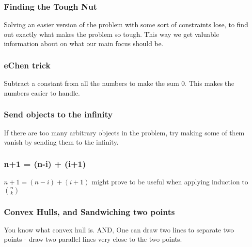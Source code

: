 	\Faka\subsubsection{Finding the Tough Nut}{Solving an easier version of the problem with some sort of constraints lose, to find out exactly what makes the problem so tough. This way we get valuable information about on what our main focus should be.}\label{finding_the_tough_nut}








	\Faka\subsubsection{eChen trick}{Subtract a constant from all the numbers to make the sum $ 0 $. This makes the numbers easier to handle.}\label{minus_constant}

	\begin{multicols}{3}
		\begin{enumerate}[wide=0em, label=\arabic*, itemsep=0pt, parsep=0pt, font=\footnotesize\bfseries]

		\end{enumerate}
	\end{multicols}








	\Faka\subsubsection{Send objects to the infinity}{If there are too many arbitrary objects in the problem, try making some of them vanish by sending them to the infinity.}








	\Faka\subsubsection{n+1 = (n-i) + (i+1)}{ $ n+1 = (n-i) + (i+1) $ might prove to be useful when applying induction to $ \binom{n}{k} $ }






	\Faka\subsubsection{Convex Hulls, and Sandwiching two points}{You know what convex hull is. AND, One can draw two lines to separate two points - draw two parallel lines very close to the two points.}\label{sandwiching_points}


